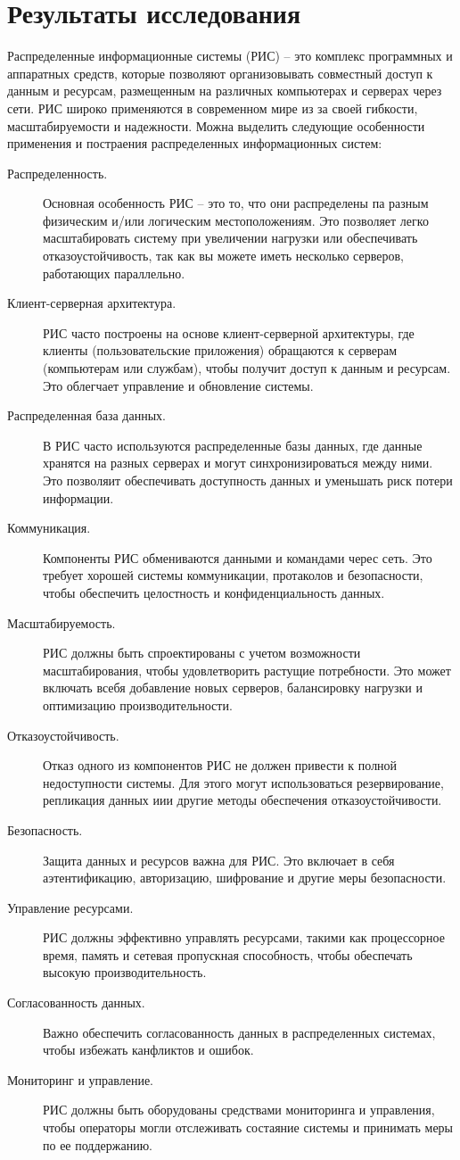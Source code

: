 \documentclass[report, draught]{fefudoc}
\begin{document}
\section{Результаты исследования}
Распределенные информационные системы (РИС) – это комплекс программных и аппаратных средств, которые позволяют организовывать совместный доступ к данным и ресурсам, размещенным на различных компьютерах и серверах через сети. РИС широко применяются в современном мире из за своей гибкости, масштабируемости и надежности. Можна выделить следующие особенности применения и постраения распределенных информационных систем:
\begin{description}
\item[Распределенность.] Основная особенность РИС – это то, что они распределены па разным физическим и/или логическим местоположениям. Это позволяет легко масштабировать систему при увеличении нагрузки или обеспечивать отказоустойчивость, так как вы можете иметь несколько серверов, работающих параллельно.
\item[Клиент-серверная архитектура.] РИС часто построены на основе клиент-серверной архитектуры, где клиенты (пользовательские приложения) обращаются к серверам (компьютерам или службам), чтобы получит доступ к данным и ресурсам. Это облегчает управление и обновление системы.
\item[Распределенная база данных.] В РИС часто используются распределенные базы данных, где данные хранятся на разных серверах и могут синхронизироваться между ними. Это позволяит обеспечивать доступность данных и уменьшать риск потери информации.
\item[Коммуникация.] Компоненты РИС обмениваются данными и командами черес сеть. Это требует хорошей системы коммуникации, протаколов и безопасности, чтобы обеспечить целостность и конфиденциальность данных.
\item[Масштабируемость.] РИС должны быть спроектированы с учетом возможности масштабирования, чтобы удовлетворить растущие потребности. Это может включать всебя добавление новых серверов, балансировку нагрузки и оптимизацию производительности.
\item[Отказоустойчивость.] Отказ одного из компонентов РИС не должен привести к полной недоступности системы. Для этого могут использоваться резервирование, репликация данных иии другие методы обеспечения отказоустойчивости.
\item[Безопасность.] Защита данных и ресурсов важна для РИС. Это включает в себя аэтентификацию, авторизацию, шифрование и другие меры безопасности.
\item[Управление ресурсами.] РИС должны эффективно управлять ресурсами, такими как процессорное время, память и сетевая пропускная способность, чтобы обеспечать высокую производительность.
\item[Согласованность данных.] Важно обеспечить согласованность данных в распределенных системах, чтобы избежать канфликтов и ошибок.
\item[Мониторинг и управление.] РИС должны быть оборудованы средствами мониторинга и управления, чтобы операторы могли отслеживать состаяние системы и принимать меры по ее поддержанию.
\end{description}
\end{document}
